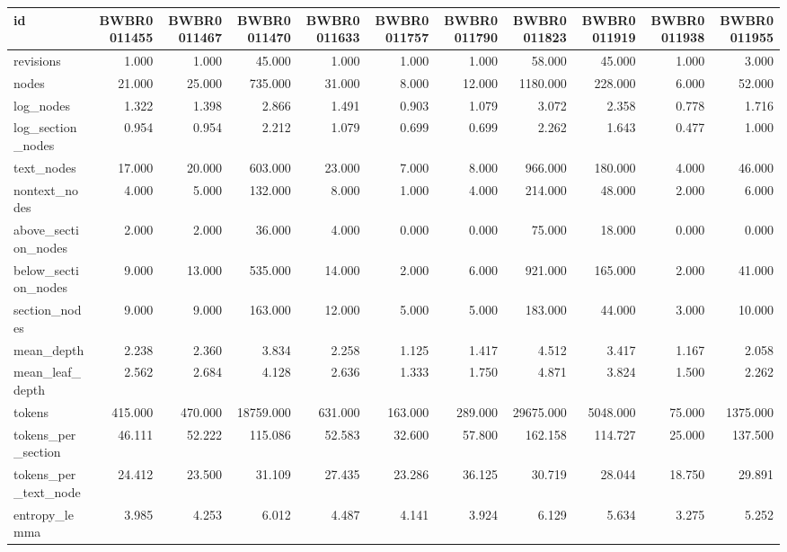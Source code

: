 \begin{tabular}{lrrrrrrrrrr}
\toprule
id & BWBR0011455 & BWBR0011467 & BWBR0011470 & BWBR0011633 & BWBR0011757 & BWBR0011790 & BWBR0011823 & BWBR0011919 & BWBR0011938 & BWBR0011955 \\
\midrule
revisions & 1.000 & 1.000 & 45.000 & 1.000 & 1.000 & 1.000 & 58.000 & 45.000 & 1.000 & 3.000 \\
\cline{1-11}
nodes & 21.000 & 25.000 & 735.000 & 31.000 & 8.000 & 12.000 & 1180.000 & 228.000 & 6.000 & 52.000 \\
\cline{1-11}
log\_nodes & 1.322 & 1.398 & 2.866 & 1.491 & 0.903 & 1.079 & 3.072 & 2.358 & 0.778 & 1.716 \\
\cline{1-11}
log\_section\_nodes & 0.954 & 0.954 & 2.212 & 1.079 & 0.699 & 0.699 & 2.262 & 1.643 & 0.477 & 1.000 \\
\cline{1-11}
text\_nodes & 17.000 & 20.000 & 603.000 & 23.000 & 7.000 & 8.000 & 966.000 & 180.000 & 4.000 & 46.000 \\
\cline{1-11}
nontext\_nodes & 4.000 & 5.000 & 132.000 & 8.000 & 1.000 & 4.000 & 214.000 & 48.000 & 2.000 & 6.000 \\
\cline{1-11}
above\_section\_nodes & 2.000 & 2.000 & 36.000 & 4.000 & 0.000 & 0.000 & 75.000 & 18.000 & 0.000 & 0.000 \\
\cline{1-11}
below\_section\_nodes & 9.000 & 13.000 & 535.000 & 14.000 & 2.000 & 6.000 & 921.000 & 165.000 & 2.000 & 41.000 \\
\cline{1-11}
section\_nodes & 9.000 & 9.000 & 163.000 & 12.000 & 5.000 & 5.000 & 183.000 & 44.000 & 3.000 & 10.000 \\
\cline{1-11}
mean\_depth & 2.238 & 2.360 & 3.834 & 2.258 & 1.125 & 1.417 & 4.512 & 3.417 & 1.167 & 2.058 \\
\cline{1-11}
mean\_leaf\_depth & 2.562 & 2.684 & 4.128 & 2.636 & 1.333 & 1.750 & 4.871 & 3.824 & 1.500 & 2.262 \\
\cline{1-11}
tokens & 415.000 & 470.000 & 18759.000 & 631.000 & 163.000 & 289.000 & 29675.000 & 5048.000 & 75.000 & 1375.000 \\
\cline{1-11}
tokens\_per\_section & 46.111 & 52.222 & 115.086 & 52.583 & 32.600 & 57.800 & 162.158 & 114.727 & 25.000 & 137.500 \\
\cline{1-11}
tokens\_per\_text\_node & 24.412 & 23.500 & 31.109 & 27.435 & 23.286 & 36.125 & 30.719 & 28.044 & 18.750 & 29.891 \\
\cline{1-11}
entropy\_lemma & 3.985 & 4.253 & 6.012 & 4.487 & 4.141 & 3.924 & 6.129 & 5.634 & 3.275 & 5.252 \\

\end{tabular}

